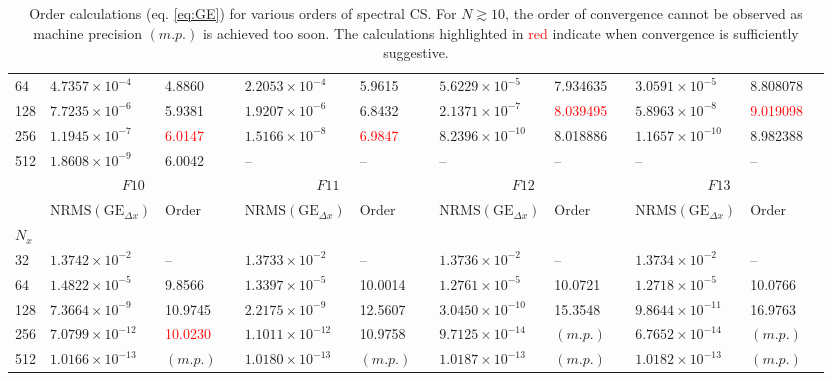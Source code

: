 \documentclass[11pt,titlepage]{report}
\begin{document}
\begin{landscape}
\begin{table}
\begin{tabular}{@{}lllcllcllclll@{}}
\phantom{a}64	&	$4.7357\times 10^{-4}$	&	4.8860            		&&	$2.2053\times 10^{-4}$	&	5.9615               		&&	$5.6229\times 10^{-5}$	&	7.934635	                &&	$3.0591\times 10^{-5}$	&	8.808078	\\
\phantom{a}128	&	$7.7235\times 10^{-6}$	&	5.9381                		&&	$1.9207\times 10^{-6}$	&	6.8432          		&&	$2.1371\times 10^{-7}$	&	\textcolor{red}{8.039495}	&&	$5.8963\times 10^{-8}$	&	\textcolor{red}{9.019098}	\\
\phantom{a}256	&	$1.1945\times 10^{-7}$	&	\textcolor{red}{6.0147}		&&	$1.5166\times 10^{-8}$	&	\textcolor{red}{6.9847}		&&	$8.2396\times 10^{-10}$	&	8.018886                 	&&	$1.1657\times 10^{-10}$	&	8.982388	\\
\phantom{a}512	&	$1.8608\times 10^{-9}$	&	6.0042           		&&	--	                &	--              		&&	--	                &	--                     		&&	--	                &	--	\\
\midrule
&\multicolumn{2}{c}{$F10$} & \phantom{abc} & \multicolumn{2}{c}{$F11$} &
\phantom{abc} & \multicolumn{2}{c}{$F12$} & \phantom{abc} & \multicolumn{2}{c}{$F13$} \\
\cmidrule{2-3} \cmidrule{5-6} \cmidrule{8-9} \cmidrule{11-12}  
& $\text{NRMS}(\text{GE}_{\Delta x})$ & Order && $\text{NRMS}(\text{GE}_{\Delta x})$ & Order && $\text{NRMS}(\text{GE}_{\Delta x})$ & Order  && $\text{NRMS}(\text{GE}_{\Delta x})$ & Order & \\
\midrule
\phantom{a}$N_x$ \\
32	&	$1.3742\times 10^{-2}$	&	--          		&&	$1.3733\times 10^{-2}$	&	--		        &&	$1.3736\times 10^{-2}$	&	--		&&	$1.3734\times 10^{-2}$	&	--	\\
64	&	$1.4822\times 10^{-5}$	&	9.8566       		&&	$1.3397\times 10^{-5}$	&	10.0014		        &&	$1.2761\times 10^{-5}$	&	10.0721		&&	$1.2718\times 10^{-5}$	&	10.0766	\\
128	&	$7.3664\times 10^{-9}$	&	10.9745 		&&	$2.2175\times 10^{-9}$	&	12.5607		        &&	$3.0450\times 10^{-10}$	&	15.3548		&&	$9.8644\times 10^{-11}$	&	16.9763	\\
256	&	$7.0799\times 10^{-12}$	&	\textcolor{red}{10.0230}&&	$1.1011\times 10^{-12}$	&	10.9758&&	$9.7125\times 10^{-14}$	&	$(m.p.)$		&&	$6.7652\times 10^{-14}$	&	$(m.p.)$	\\
512	&	$1.0166\times 10^{-13}$	&	$(m.p.)$		&&	$1.0180\times 10^{-13}$	&	$(m.p.)$		&&	$1.0187\times 10^{-13}$	&	$(m.p.)$		&&	$1.0182\times 10^{-13}$	&	$(m.p.)$	\\
\bottomrule[2 pt]
\end{tabular}
\caption{Order calculations (eq. \eqref{eq:GE}) for various orders of spectral CS. For $N \gtrsim 10$, the order of convergence cannot be observed as machine precision $(m.p.)$ is achieved too soon. The calculations highlighted in \textcolor{red}{red} indicate when convergence is sufficiently suggestive.}
\label{tbl:FN_order_calcs}
\end{table}
\end{landscape}
\end{document}
